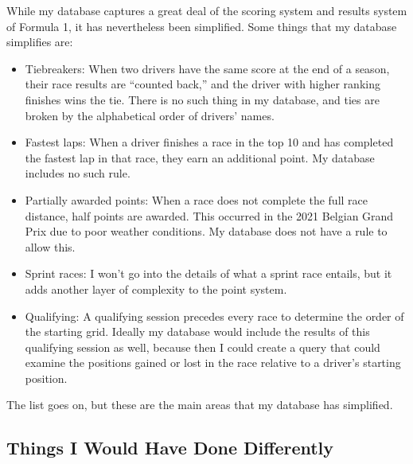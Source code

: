 \documentclass{article} %
\begin{document}
While my database captures a great deal of the scoring system and
results system of Formula 1, it has nevertheless been simplified. Some
things that my database simplifies are:
\begin{itemize}
    \item Tiebreakers: When two drivers have the same score at the end
    of a season, their race results are ``counted back,'' and the driver
    with higher ranking finishes wins the tie. There is no such thing in
    my database, and ties are broken by the alphabetical order of
    drivers' names.

    \item Fastest laps: When a driver finishes a race in the top 10 and
    has completed the fastest lap in that race, they earn an additional
    point. My database includes no such rule.

    \item Partially awarded points: When a race does not complete the
    full race distance, half points are awarded. This occurred in the
    2021 Belgian Grand Prix due to poor weather conditions. My database
    does not have a rule to allow this.
    
    \item Sprint races: I won't go into the details of what a sprint
    race entails, but it adds another layer of complexity to the point
    system. 

    \item Qualifying: A qualifying session precedes every race to
    determine the order of the starting grid. Ideally my database would
    include the results of this qualifying session as well, because then
    I could create a query that could examine the positions gained or
    lost in the race relative to a driver's starting position.
\end{itemize}
The list goes on, but these are the main areas that my database has
simplified. 

\subsection{Things I Would Have Done Differently}
\end{document}

